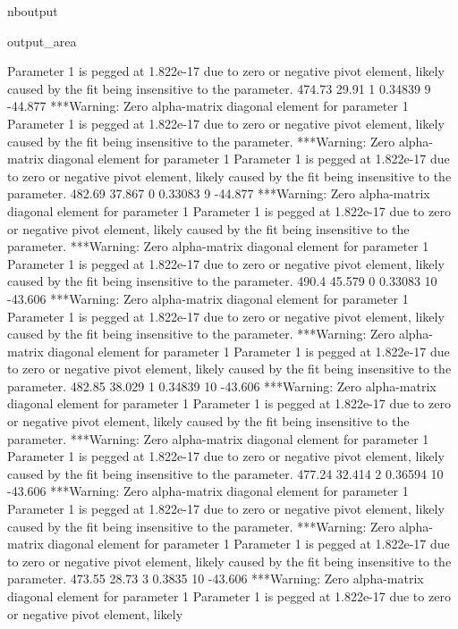 \documentclass[letterpaper,10pt,english]{sphinxmanual}
\begin{document}
\begin{sphinxuseclass}{nboutput}
{\begin{sphinxuseclass}{output_area}
\begin{sphinxuseclass}{}
\begin{sphinxVerbatim}[commandchars=\\\{\}]
 Parameter 1 is pegged at 1.822e-17 due to zero or negative pivot element, likely
 caused by the fit being insensitive to the parameter.
          474.73       29.91    1     0.34839    9     -44.877
***Warning: Zero alpha-matrix diagonal element for parameter 1
 Parameter 1 is pegged at 1.822e-17 due to zero or negative pivot element, likely
 caused by the fit being insensitive to the parameter.
***Warning: Zero alpha-matrix diagonal element for parameter 1
 Parameter 1 is pegged at 1.822e-17 due to zero or negative pivot element, likely
 caused by the fit being insensitive to the parameter.
          482.69      37.867    0     0.33083    9     -44.877
***Warning: Zero alpha-matrix diagonal element for parameter 1
 Parameter 1 is pegged at 1.822e-17 due to zero or negative pivot element, likely
 caused by the fit being insensitive to the parameter.
***Warning: Zero alpha-matrix diagonal element for parameter 1
 Parameter 1 is pegged at 1.822e-17 due to zero or negative pivot element, likely
 caused by the fit being insensitive to the parameter.
           490.4      45.579    0     0.33083   10     -43.606
***Warning: Zero alpha-matrix diagonal element for parameter 1
 Parameter 1 is pegged at 1.822e-17 due to zero or negative pivot element, likely
 caused by the fit being insensitive to the parameter.
***Warning: Zero alpha-matrix diagonal element for parameter 1
 Parameter 1 is pegged at 1.822e-17 due to zero or negative pivot element, likely
 caused by the fit being insensitive to the parameter.
          482.85      38.029    1     0.34839   10     -43.606
***Warning: Zero alpha-matrix diagonal element for parameter 1
 Parameter 1 is pegged at 1.822e-17 due to zero or negative pivot element, likely
 caused by the fit being insensitive to the parameter.
***Warning: Zero alpha-matrix diagonal element for parameter 1
 Parameter 1 is pegged at 1.822e-17 due to zero or negative pivot element, likely
 caused by the fit being insensitive to the parameter.
          477.24      32.414    2     0.36594   10     -43.606
***Warning: Zero alpha-matrix diagonal element for parameter 1
 Parameter 1 is pegged at 1.822e-17 due to zero or negative pivot element, likely
 caused by the fit being insensitive to the parameter.
***Warning: Zero alpha-matrix diagonal element for parameter 1
 Parameter 1 is pegged at 1.822e-17 due to zero or negative pivot element, likely
 caused by the fit being insensitive to the parameter.
          473.55       28.73    3      0.3835   10     -43.606
***Warning: Zero alpha-matrix diagonal element for parameter 1
 Parameter 1 is pegged at 1.822e-17 due to zero or negative pivot element, likely

\end{sphinxVerbatim}
\end{sphinxuseclass}
\end{sphinxuseclass}}
\end{sphinxuseclass}
\end{document}
